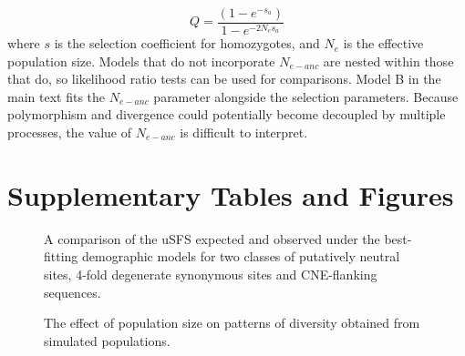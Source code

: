 \begin{equation}
Q = \frac{(1 - e^{-s_a})}{1-e^{-2N_es_a}}
\end{equation}
where $s$ is the selection coefficient for homozygotes, and $N_e$ is the effective population size. Models that do not incorporate $N_{e-anc}$ are nested within those that do, so likelihood ratio tests can be used for comparisons. Model B in the main text fits the $N_{e-anc}$ parameter alongside the selection parameters. Because polymorphism and divergence could potentially become decoupled by multiple processes, the value of $N_{e-anc}$ is difficult to interpret. 

\section{Supplementary Tables and Figures}
















 \begin{figure}[h!]
   \centering      
   \noindent{}
 \caption[A comparison of the uSFS expected and observed under demographic models fitted to two classes of sites]{A comparison of the uSFS expected and observed under the best-fitting demographic models for two classes of putatively neutral sites, 4-fold degenerate synonymous sites and CNE-flanking sequences.}
 \label{fig:CS1}
\end{figure}



 \begin{figure}[h!]
   \centering      
   \noindent{}
 \caption[The effect of population size on patterns of diversity obtained from simulated populations]{The effect of population size on patterns of diversity obtained from simulated populations. }
 \label{fig:CS2}
\end{figure}




